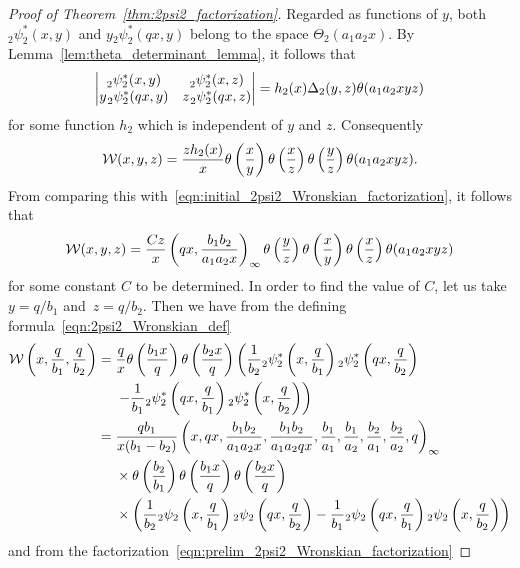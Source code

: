 \documentclass[pdftex]{sigma}
\numberwithin{equation}{section}
\renewcommand{\sp}{\hspace{0.5pt}}
\begin{document}
\begin{proof}[Proof of Theorem~\ref{thm:2psi2_factorization}]
Regarded as functions of $y$, both ${}_2^{}\psi_2^\ast(x,y)$ and $y {}_2^{}\psi_2^\ast(qx,y)$ belong to the space $\Theta_2(a_1a_2x)$. By Lemma~\ref{lem:theta_determinant_lemma}, it follows that
\[ \left| \begin{matrix} {}_2^{}\psi_2^\ast(x,y) &{}_2^{}\psi_2^\ast(x,z) \\
y \sp {}_2^{}\psi_2^\ast(qx,y) &z \sp {}_2^{}\psi_2^\ast(qx,z) \end{matrix} \right| = h_2(x) \Delta_2(y,z) \theta(a_1a_2xyz) \]
for some function $h_2$ which is independent of $y$ and $z$. Consequently
\[ \mathcal{W}(x,y,z) = {z h_2(x) \over x}\theta\left( {x \over y} \right) \theta\left( {x \over z} \right) \theta\left({y \over z} \right) \theta(a_1a_2xyz). \]
From comparing this with~\eqref{eqn:initial_2psi2_Wronskian_factorization}, it follows that
\begin{equation} \label{eqn:prelim_2psi2_Wronskian_factorization}
\mathcal{W}(x,y,z) = {Cz \over x} \left(qx,{b_1b_2 \over a_1a_2x}\right)_{ \infty} \theta\left({y \over z} \right) \theta\left( {x \over y} \right) \theta\left( {x \over z} \right) \theta(a_1a_2xyz)
\end{equation}
for some constant $C$ to be determined. In order to find the value of $C$, let us take $y=q/b_1$ and~${z=q/b_2}$. Then we have from the defining formula~\eqref{eqn:2psi2_Wronskian_def}
\begin{align*}
\mathcal{W}\left(x,{q \over b_1},{q \over b_2}\right)= {}&{q \over x}\theta\left( {b_1x \over q} \right) \theta\left( {b_2x \over q} \right) \left( {1 \over b_2} {}_2^{}\psi_2^\ast\left(x,{q \over b_1}\right) {}_2^{}\psi_2^\ast\left(qx,{q \over b_2}\right)\right.\\
 &\left.- {1 \over b_1} {}_2^{}\psi_2^\ast\left(qx,{q \over b_1}\right){}_2^{}\psi_2^\ast\left(x,{q \over b_2}\right) \right) \\
={}&{qb_1 \over x(b_1-b_2)} \left(x,qx,{b_1b_2 \over a_1a_2x},{b_1b_2 \over a_1a_2qx},{b_1 \over a_1},{b_1 \over a_2},{b_2 \over a_1},{b_2 \over a_2},q\right)_{ \infty} \\
&\times\theta\left( {b_2 \over b_1} \right) \theta\left( {b_1x \over q} \right) \theta\left( {b_2x \over q} \right) \\
& \times \left( {1 \over b_2} {}_2\psi_2\left(x,{q \over b_1}\right) {}_2\psi_2\left(qx,{q \over b_2}\right) - {1 \over b_1} {}_2\psi_2\left(qx,{q \over b_1}\right){}_2\psi_2\left(x,{q \over b_2}\right) \right)
\end{align*}
and from the factorization~\eqref{eqn:prelim_2psi2_Wronskian_factorization}

\end{proof}
\end{document}
